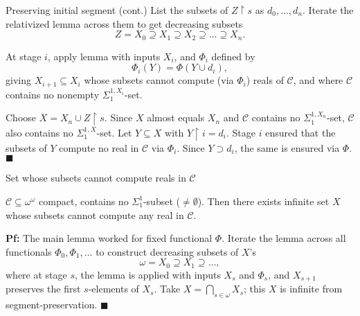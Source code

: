 \begin{frame}{Preserving initial segment (cont.)}
  List the subsets of $Z\restriction s$ as $d_0,\ldots,d_n$. Iterate the
  relativized lemma across them to get decreasing subsets
  \[Z=X_0 \supseteq X_1 \supseteq X_2 \supseteq\ldots \supseteq X_n.\]

  \pause
  At stage $i$, apply lemma with inputs $X_i$, and $\Phi_i$ defined by
  \[\Phi_i(Y) =\Phi(Y\cup d_i),\]
  giving $X_{i+1}\subseteq X_i$ whose subsets cannot compute (via
  $\Phi_i$) reals of $\mathcal{C}$, and where $\mathcal{C}$ contains no
  nonempty $\Sigma_1^{1,X_i}$-set.

  \pause
  \vspace{1em}
  Choose $X=X_n\cup Z\restriction s$. Since $X$ almost equals $X_n$ and
  $\mathcal{C}$ contains no $\Sigma_1^{1,X_n}$-set, $\mathcal{C}$ also
  contains no $\Sigma_1^{1,X}$-set. Let $Y\subseteq X$ with $Y\restriction
  i=d_i$. Stage $i$ ensured that the subsets of $Y$ compute no real in
  $\mathcal{C}$ via $\Phi_i$. Since $Y\supset d_i$, the same is ensured via
  $\Phi$. $\blacksquare$
\end{frame}

\begin{frame}{Set whose subsets cannot compute reals in $\mathcal{C}$}
  \begin{main-thm*}
    $\mathcal{C}\subseteq\omega^\omega$ compact, contains no
    $\Sigma_1^1$-subset ($\neq\emptyset$). Then there exists infinite set
    $X$ whose subsets cannot compute any real in $\mathcal{C}$.
  \end{main-thm*}

  \pause
  \vspace{1em}
  \textbf{Pf:} The main lemma worked for fixed functional $\Phi$. Iterate
  the lemma across all functionals $\Phi_0,\Phi_1,\ldots$ to construct
  decreasing subsets of $X$'s
  \[\omega= X_0\supseteq X_1\supseteq\ldots,\]
  where at stage $s$, the lemma is applied with inputs $X_s$ and
  $\Phi_s$, and $X_{s+1}$ preserves the first $s$-elements of $X_s$. Take
  $X=\bigcap_{s\in\omega}X_s$; this $X$ is infinite from
  segment-preservation. $\blacksquare$
\end{frame}
